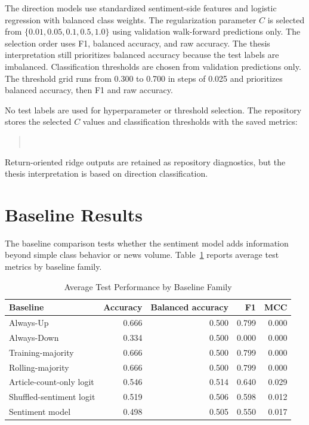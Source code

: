 The direction models use standardized sentiment-side features and logistic regression with balanced class weights. The regularization parameter $C$ is selected from $\{0.01, 0.05, 0.1, 0.5, 1.0\}$ using validation walk-forward predictions only. The selection order uses F1, balanced accuracy, and raw accuracy. The thesis interpretation still prioritizes balanced accuracy because the test labels are imbalanced. Classification thresholds are chosen from validation predictions only. The threshold grid runs from 0.300 to 0.700 in steps of 0.025 and prioritizes balanced accuracy, then F1 and raw accuracy.

No test labels are used for hyperparameter or threshold selection. The repository stores the selected $C$ values and classification thresholds with the saved metrics:
\begin{quote}
\small
{}\\
\end{quote}
Return-oriented ridge outputs are retained as repository diagnostics, but the thesis interpretation is based on direction classification.

\section{Baseline Results}

The baseline comparison tests whether the sentiment model adds information beyond simple class behavior or news volume. Table~\ref{tab:baseline_summary} reports average test metrics by baseline family.

\begin{table}[!htbp]
\centering
\caption{Average Test Performance by Baseline Family}
\label{tab:baseline_summary}
\small
\begin{tabular}{lrrrr}
\toprule
Baseline & Accuracy & Balanced accuracy & F1 & MCC \\
\midrule
Always-Up & 0.666 & 0.500 & 0.799 & 0.000 \\
Always-Down & 0.334 & 0.500 & 0.000 & 0.000 \\
Training-majority & 0.666 & 0.500 & 0.799 & 0.000 \\
Rolling-majority & 0.666 & 0.500 & 0.799 & 0.000 \\
Article-count-only logit & 0.546 & 0.514 & 0.640 & 0.029 \\
Shuffled-sentiment logit & 0.519 & 0.506 & 0.598 & 0.012 \\
Sentiment model & 0.498 & 0.505 & 0.550 & 0.017 \\
\bottomrule
\end{tabular}
\end{table}
\FloatBarrier

